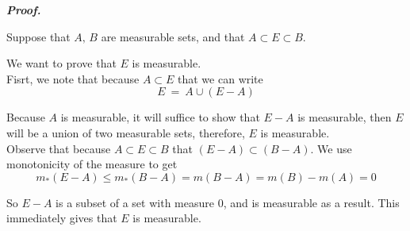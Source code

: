 \documentclass[a4paper,11pt]{article}
\begin{document}
\textbf{\textit{Proof.}}

Suppose that $A,\,B$ are measurable sets, and that $A \subset E \subset B$.

We want to prove that $E$ is measurable.\\

Fisrt, we note that because $A \subset E$ that we can write
	$$E\ =\ A \cup (E - A)$$

Because $A$ is measurable, it will suffice to show that $E - A$ is measurable, then $E$ will be a union of two measurable sets, therefore, $E$ is measurable.\\

Observe that because $A \subset E \subset B$ that $(E - A) \subset (B - A)$. We use monotonicity of the measure to get
	$$m_*(E - A) \leq m_*(B - A)
	= m(B - A) = m(B) - m(A) = 0$$

So $E - A$ is a subset of a set with measure $0$, and is measurable as a result. This immediately gives that $E$ is measurable. 


			
\end{document}
